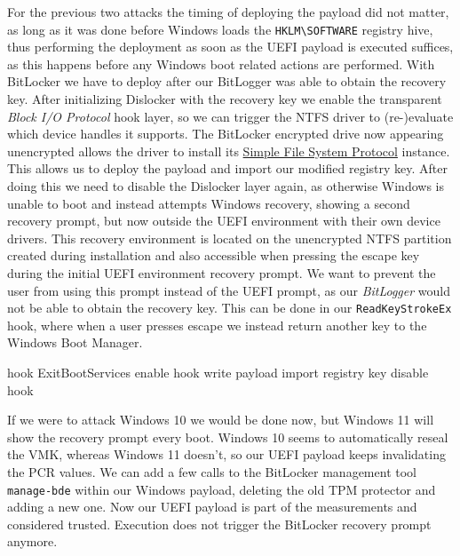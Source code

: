 For the previous two attacks the timing of deploying the payload did not matter, as long as it was done before Windows loads the \lstinline{HKLM\SOFTWARE} registry hive, thus performing the deployment as soon as the \ac{UEFI} payload is executed suffices, as this happens before any Windows boot related actions are performed.
With BitLocker we have to deploy after our BitLogger was able to obtain the recovery key.
After initializing Dislocker with the recovery key we enable the transparent \emph{Block \ac{I/O} Protocol} hook layer, so we can trigger the \ac{NTFS} driver to (re-)evaluate which device handles it supports.
The BitLocker encrypted drive now appearing unencrypted allows the driver to install its \hyperref[lst:simple-filesytem-protocol]{Simple File System Protocol} instance.
This allows us to deploy the payload and import our modified registry key.
After doing this we need to disable the Dislocker layer again, as otherwise Windows is unable to boot and instead attempts Windows recovery, showing a second recovery prompt, but now outside the \ac{UEFI} environment with their own device drivers.
This recovery environment is located on the unencrypted \ac{NTFS} partition created during installation and also accessible when pressing the escape key during the initial \ac{UEFI} environment recovery prompt.
We want to prevent the user from using this prompt instead of the \ac{UEFI} prompt, as our \emph{BitLogger} would not be able to obtain the recovery key.
This can be done in our \lstinline{ReadKeyStrokeEx} hook, where when a user presses escape we instead return another key to the Windows Boot Manager.

\cite{exitbootservices-hooking}
hook ExitBootServices
enable hook
write payload
import registry key
disable hook


If we were to attack Windows 10 we would be done now, but Windows 11 will show the recovery prompt every boot.
Windows 10 seems to automatically reseal the \ac{VMK}, whereas Windows 11 doesn't, so our \ac{UEFI} payload keeps invalidating the \ac{PCR} values.
We can add a few calls to the BitLocker management tool \lstinline{manage-bde} \cite{microsoft-bitlocker-manage-bde} within our Windows payload, deleting the old \ac{TPM} protector and adding a new one.
Now our \ac{UEFI} payload is part of the measurements and considered trusted.
Execution does not trigger the BitLocker recovery prompt anymore.

